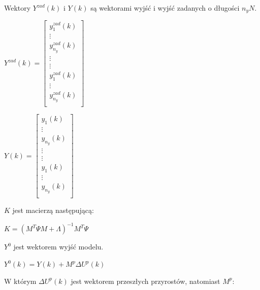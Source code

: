 \medskip

Wektory $Y^{zad}(k)$ i $Y(k)$ są wektorami wyjść i wyjść zadanych o długości $n_yN$.

\medskip

\begin{math}
    Y^{zad}(k) = \begin{bmatrix}
        y^{zad}_1(k) \\
        \vdots \\
        y^{zad}_{n_y}(k) \\
        \vdots \\
        \vdots \\
        y^{zad}_1(k) \\
        \vdots \\
        y^{zad}_{n_y}(k) \\
    \end{bmatrix}
\end{math}

\medskip

\begin{math}
    Y(k) = \begin{bmatrix}
        y_1(k) \\
        \vdots \\
        y_{n_y}(k) \\
        \vdots \\
        \vdots \\
        y_1(k) \\
        \vdots \\
        y_{n_y}(k) \\
    \end{bmatrix}
\end{math}

\medskip

$K$ jest macierzą następującą:

\medskip

\begin{math}
    K = (M^T \varPsi M + \varLambda )^{-1} M^T \varPsi 
\end{math}

\medskip

$Y^0$ jest wektorem wyjść modelu.

\medskip

\begin{math}
    Y^0(k) = Y(k) + M^p \Delta U^p(k)
\end{math}

\medskip

W którym $\Delta U^p(k)$ jest wektorem przeszłych przyrostów, natomiast $M^p$:

